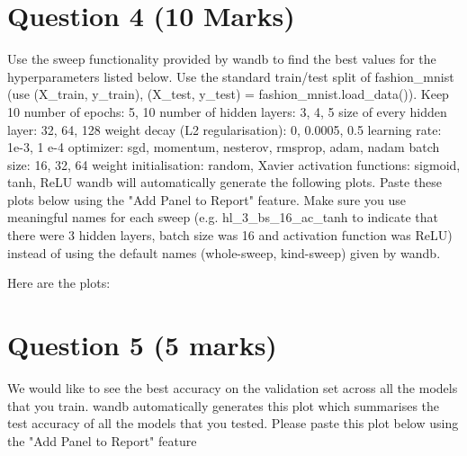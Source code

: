 \documentclass{article}
\begin{document}
\section{Question 4 (10 Marks)}
Use the sweep functionality provided by wandb to find the best values for the hyperparameters listed below. Use the standard train/test split of fashion_mnist (use (X_train, y_train), (X_test, y_test) = fashion_mnist.load_data()).  Keep 10%
number of epochs: 5, 10
number of hidden layers:  3, 4, 5
size of every hidden layer:  32, 64, 128
weight decay (L2 regularisation): 0, 0.0005,  0.5
learning rate: 1e-3, 1 e-4 
optimizer:  sgd, momentum, nesterov, rmsprop, adam, nadam
batch size: 16, 32, 64
weight initialisation: random, Xavier
activation functions: sigmoid, tanh, ReLU
wandb will automatically generate the following plots. Paste these plots below using the "Add Panel to Report" feature. Make sure you use meaningful names for each sweep (e.g. hl_3_bs_16_ac_tanh to indicate that there were 3 hidden layers, batch size was 16 and activation function was ReLU) instead of using the default names (whole-sweep, kind-sweep) given by wandb.

Here are the plots:
\section{Question 5 (5 marks)}
We would like to see the best accuracy on the validation set across all the models that you train.
wandb automatically generates this plot which summarises the test accuracy of all the models that you tested. Please paste this plot below using the "Add Panel to Report" feature
\end{document}
